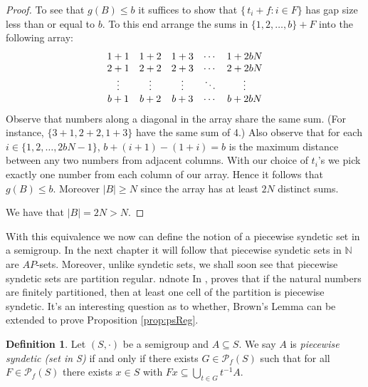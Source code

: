 \documentclass[12pt,showtrims]{memoir}
\theoremstyle{plain}
\theoremstyle{definition}
\newtheorem{defn}[thm]{Definition}
\newcommand{\bbN}{\mathbb{N}}
\newcommand{\Pf}{\mathcal{P}_f}
\begin{document}
\begin{proof}
  To see that $g(B) \le b$ it suffices to show that $\{\, t_i + f : i \in F\}$ has gap size less than or equal to $b$.
  To this end arrange the sums in $\{1, 2, \ldots, b\} + F$ into the following array:
  \[
    \begin{array}[t]{ccccc}
      1+1 & 1+2 & 1+3 & \cdots & 1+2bN \\
      2+1 & 2+2 & 2+3 & \cdots & 2+2bN \\
      \vdots & \vdots & \vdots & \ddots & \vdots \\
      b+1 & b+2 & b+3 & \cdots & b+2bN 
    \end{array}
  \]
  Observe that numbers along a diagonal in the array share the same sum. 
  (For instance, $\{3+1, 2+2, 1+3\}$ have the same sum of 4.)
  Also observe that for each $i \in \{1, 2, \ldots, 2bN - 1\}$, $b + (i+1) - (1 +i) = b$ is the maximum distance between any two numbers from adjacent columns. 
  With our choice of $t_i$'s we pick exactly one number from each column of our array.
  Hence it follows that $g(B) \le b$.
  Moreover $|B| \ge N$ since the array has at least $2N$ distinct sums. 

  We have that $|B| = 2N > N$.
\end{proof}

With this equivalence we now can define the notion of a piecewise
syndetic set in a semigroup. 
In the next chapter it will follow that piecewise syndetic sets in $\bbN$ are $AP$-sets.
Moreover, unlike syndetic sets, we shall soon see that piecewise syndetic sets are partition regular.%
ndnote{
  In \cite[Lemma 1]{Brown:1971bh}, proves that if the natural numbers are finitely partitioned, then at least one cell of the partition is piecewise syndetic.
  It's an interesting question as to whether, Brown's Lemma can be extended to prove Proposition \ref{prop:psReg}.
}

\begin{defn}
  Let $(S, \cdot)$ be a semigroup and $A \subseteq S$.
  We say $A$ is \emph{piecewise syndetic (set in S)} if and only if there exists $G \in \Pf(S)$ such that for all $F \in \Pf(S)$ there exists $x \in S$ with $Fx \subseteq \bigcup_{t \in G} t^{-1}A$.
\end{defn}
\end{document}
